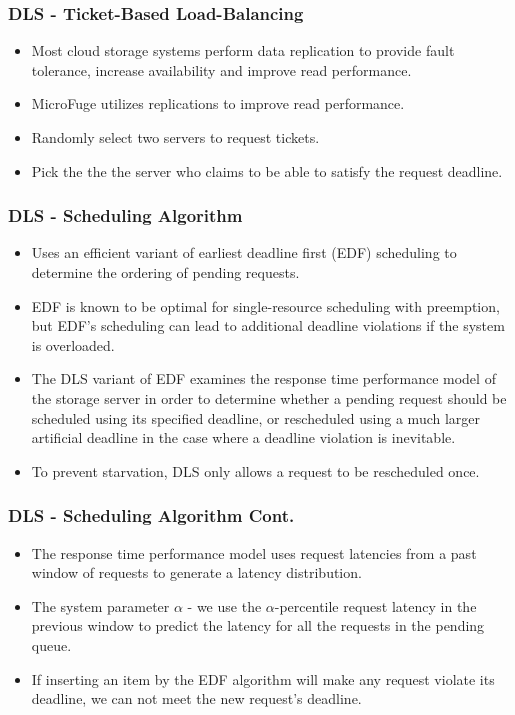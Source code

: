 \documentclass{beamer}
\begin{document}
\begin{frame}
\frametitle{DLS - Ticket-Based Load-Balancing}
\begin{itemize}
\item Most cloud storage systems perform data replication
to provide fault tolerance, increase availability and improve read performance.
\item MicroFuge utilizes replications to improve read performance.
\item Randomly select two servers to request tickets.
\item Pick the the the server who claims to be able to satisfy the request deadline.
\end{itemize}
\end{frame}

\begin{frame}
\frametitle{DLS - Scheduling Algorithm}
\begin{itemize}
\item Uses an efficient variant of earliest deadline first (EDF) scheduling to determine the ordering
of pending requests.
\item EDF is known to be optimal for single-resource scheduling with preemption,
but EDF's scheduling can lead to additional deadline violations if the system is overloaded.
\item The DLS variant of EDF examines the response time performance model
of the storage server in order to determine whether a pending request should be scheduled
using its specified deadline, or rescheduled using a much larger artificial deadline in the case
where a deadline violation is inevitable.
\item To prevent starvation, DLS only allows a request to be rescheduled once.
\end{itemize}
\end{frame}

\begin{frame}
\frametitle{DLS - Scheduling Algorithm Cont.}
\begin{itemize}
\item The response time performance model uses request latencies from a past window of requests to
generate a latency distribution.
\item The system parameter $\alpha$ - we use the $\alpha$-percentile request
latency in the previous window to predict the latency for all the requests in the pending queue.
\item If inserting an item by the EDF algorithm will make any request violate its deadline, we can not meet
the new request's deadline.
\end{itemize}
\end{frame}
\end{document}
